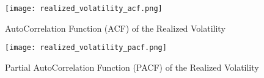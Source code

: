 \begin{solution}
\begin{enumerate}[label = \arabic*)]
    \begin{figure}[!htbp]
        \centering
        \caption{AutoCorrelation Function (ACF) of the Realized Volatility}
        \label{fig:realized_volatility_acf}
        \texttt{[image: realized\_volatility\_acf.png]}
    \end{figure}
    
    \begin{figure}[!htbp]
        \centering
        \caption{Partial AutoCorrelation Function (PACF) of the Realized Volatility}
        \label{fig:realized_volatility_pacf}
        \texttt{[image: realized\_volatility\_pacf.png]}
    \end{figure}
\end{enumerate}
\end{solution}